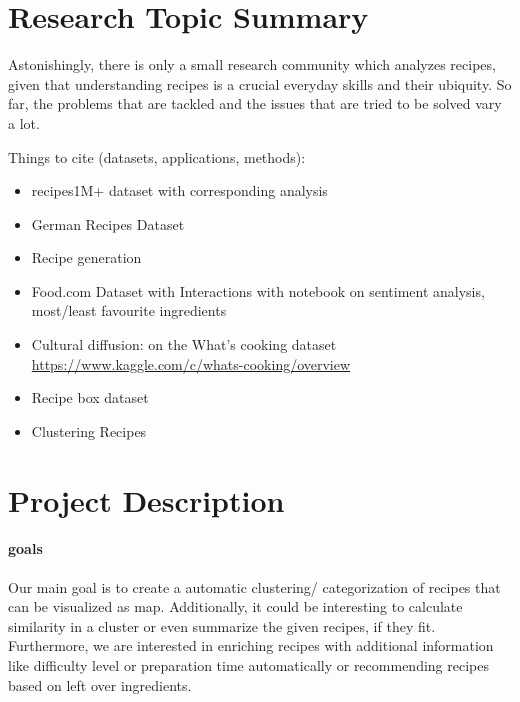 \documentclass[
     12pt,         %
     a4paper,      %
     BCOR10mm,     %
     DIV14,        %
     ]{article}
\begin{document}

\section{Research Topic Summary}

Astonishingly, there is only a small research community which analyzes recipes, given that understanding recipes is a crucial everyday skills and their ubiquity. So far, the problems that are tackled and the issues that are tried to be solved vary a lot. 

Things to cite (datasets, applications, methods):
\begin{itemize}
  \item recipes1M+ dataset \cite{marin2019recipe1m} with corresponding analysis \cite{8099810}
  \item German Recipes Dataset \cite{germanrecipesdataset}
  \item Recipe generation \cite{majumder-etal-2019-generating}
  \item Food.com Dataset with Interactions \cite{foodcominteractions} with notebook on sentiment analysis, most/least favourite ingredients
  \item Cultural diffusion: \cite{cultdiffusion} on the What's cooking dataset \url{https://www.kaggle.com/c/whats-cooking/overview}
  \item Recipe box dataset \cite{recipebox}
  \item Clustering Recipes \cite{clusteringrecipes}
\end{itemize}


\section{Project Description}

\paragraph{goals} Our main goal is to create a automatic clustering/ categorization  of recipes that can be visualized as map.  Additionally, it could be interesting to calculate similarity in a cluster or even summarize the given recipes, if they fit. Furthermore, we are interested in enriching recipes with 
additional information like difficulty level or preparation time automatically or recommending recipes based on left over ingredients.
\end{document}
